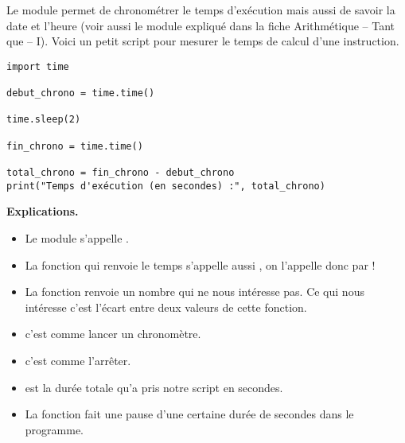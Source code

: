 \documentclass[11pt,class=report,crop=false]{standalone}
\begin{document}

\begin{cours}[Chronomètre]


Le module  permet de chronométrer le temps d'exécution mais aussi de savoir la date et l'heure (voir aussi le module  expliqué dans la fiche \og{}Arithmétique -- Tant que -- I\fg{}).
Voici un petit script pour mesurer le temps de calcul d'une instruction. 

\begin{lstlisting}
import time

debut_chrono = time.time()

time.sleep(2)

fin_chrono = time.time()

total_chrono = fin_chrono - debut_chrono
print("Temps d'exécution (en secondes) :", total_chrono)
\end{lstlisting}


\textbf{Explications.}
\begin{itemize}
  \item Le module s'appelle .
  \item La fonction qui renvoie le temps s'appelle aussi , on l'appelle donc par  !
  \item La fonction  renvoie un nombre qui ne nous intéresse pas. Ce qui nous intéresse c'est l'écart entre deux valeurs de cette fonction. 
  \item {} c'est comme lancer un chronomètre.
  \item {} c'est comme l'arrêter.
  \item {} est la durée totale qu'a pris notre script en secondes.
  \item La fonction  fait une pause d'une certaine durée de secondes dans le programme.
\end{itemize}
\end{cours}


\end{document}
